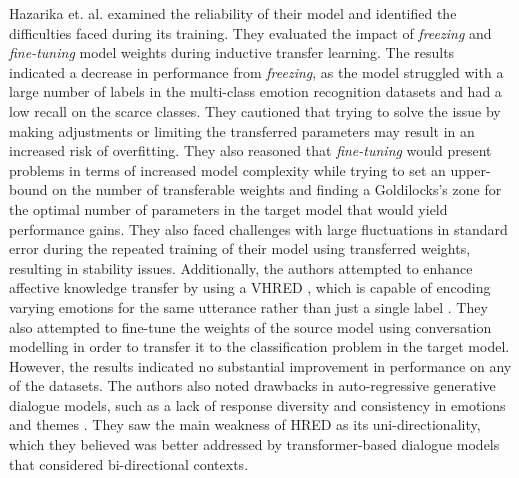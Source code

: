 Hazarika et. al. examined the reliability of their model and identified the difficulties faced during its training. They evaluated the impact of \textit{freezing} and \textit{fine-tuning} model weights during inductive transfer learning. The results indicated a decrease in performance from \textit{freezing}, as the model struggled with a large number of labels in the multi-class emotion recognition datasets and had a low recall on the scarce classes. They cautioned that trying to solve the issue by making adjustments or limiting the transferred parameters may result in an increased risk of overfitting. They also reasoned that \textit{fine-tuning} would present problems in terms of increased model complexity while trying to set an upper-bound on the number of transferable weights and finding a Goldilocks's zone for the optimal number of parameters in the target model that would yield performance gains. They also faced challenges with large fluctuations in standard error during the repeated training of their model using transferred weights, resulting in stability issues. Additionally, the authors attempted to enhance affective knowledge transfer by using a VHRED \cite{Serban2016AHL}, which is capable of encoding varying emotions for the same utterance rather than just a single label \cite{Provost2011AFF}. They also attempted to fine-tune the weights of the source model using conversation modelling in order to transfer it to the classification problem in the target model. However, the results indicated no substantial improvement in performance on any of the datasets. The authors also noted drawbacks in auto-regressive generative dialogue models, such as a lack of response diversity \cite{Li2015ADO} and consistency in emotions and themes \cite{Zhou2017EmotionalCM}. They saw the main weakness of HRED as its uni-directionality, which they believed was better addressed by transformer-based dialogue models that considered bi-directional contexts.





